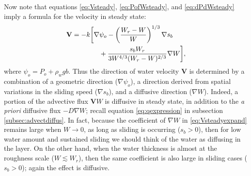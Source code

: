 \documentclass[gmd]{copernicus}   %
\newcommand\bV{\mathbf{V}}
\newcommand{\grad}{\nabla}
\begin{document}
Now note that equations \eqref{eq:Vsteady}, \eqref{eq:PofWsteady}, and \eqref{eq:dPdWsteady} imply a formula for the velocity in steady state:
\begin{align}
\bV &= - k \bigg[\grad \psi_o - \left(\frac{W_r - W}{W}\right)^{1/3} \grad s_b \label{eq:Vsteadyexpand} \\
    & \qquad \qquad + \frac{s_b W_r}{3 W^{4/3} (W_r - W)^{2/3}} \grad W\bigg], \notag
\end{align}
where $\psi_o = P_o + \rho_w g b$.  Thus the direction of water velocity $\bV$ is determined by a combination of a geometric direction ($\grad \psi_o$), a direction derived from spatial variations in the sliding speed ($\grad s_b$), and a diffusive direction ($\grad W$).  Indeed, a portion of the advective flux $\bV W$ is diffusive in steady state, in addition to the \emph{a priori} diffusive flux $- D \grad W$; recall equation \eqref{eq:qexpression} in subsection \ref{subsec:advectdiffus}.  In fact, because the coefficient of $\grad W$ in \eqref{eq:Vsteadyexpand} remains large when $W\to 0$, as long as sliding is occurring ($s_b > 0$), then for low water amount and sustained sliding we should think of the water as diffusing in the layer.  On the other hand, when the water thickness is almost at the roughness scale ($W\lesssim W_r$), then the same coefficient is also large in sliding cases ($s_b>0$); again the effect is diffusive.


\end{document}
